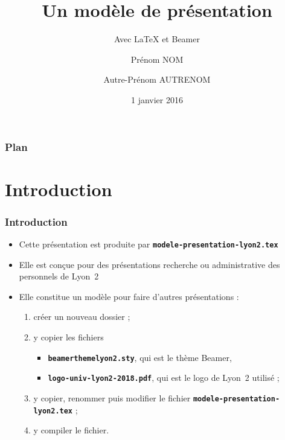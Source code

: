 \documentclass[10pt,t]{beamer}
\title{Un modèle de présentation}
\subtitle{Avec \LaTeX{} et Beamer}
\author{Prénom NOM \and Autre-Prénom AUTRENOM}
\institute{Université Lyon~2}
\date{1\ier{} janvier 2016}
\begin{document}
\maketitle

\begin{frame}
  \frametitle{Plan}
  \tableofcontents %
\end{frame}


\section{Introduction}


\begin{frame}%
  \frametitle{Introduction}


  \begin{itemize}
  \item Cette présentation est produite par \texttt{\textbf{modele-presentation-lyon2.tex}}
  \item Elle est conçue pour des présentations recherche ou administrative des personnels de Lyon~2
  \end{itemize}

  \pause


  \begin{itemize}
  \item Elle constitue un modèle pour faire d'autres présentations :
    
    \begin{enumerate}
    \item créer un nouveau dossier ;
    \item y copier les fichiers 

      \begin{itemize}
      \item \texttt{\textbf{beamerthemelyon2.sty}}, qui est le thème Beamer,
      \item \texttt{\textbf{logo-univ-lyon2-2018.pdf}}, qui est le logo de Lyon~2 utilisé ;
      \end{itemize}

    \item y copier, renommer puis modifier le fichier \texttt{\textbf{modele-presentation-lyon2.tex}} ;
    \item y compiler le fichier.
    \end{enumerate}
  \end{itemize}
  
\end{frame}
\end{document}
